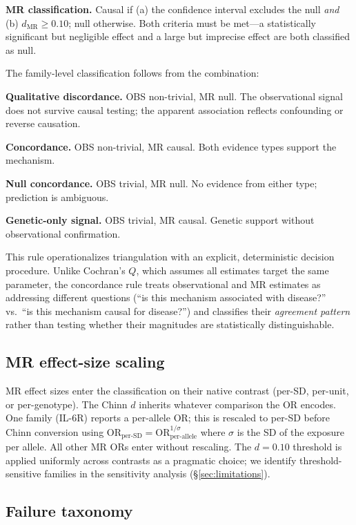 \documentclass[11pt]{article}
\begin{document}
\textbf{MR classification.} Causal if (a) the confidence interval excludes the null \emph{and} (b) $d_{\text{MR}} \geq 0.10$; null otherwise. Both criteria must be met---a statistically significant but negligible effect and a large but imprecise effect are both classified as null.

The family-level classification follows from the combination:

\textbf{Qualitative discordance.} OBS non-trivial, MR null. The observational signal does not survive causal testing; the apparent association reflects confounding or reverse causation.

\textbf{Concordance.} OBS non-trivial, MR causal. Both evidence types support the mechanism.

\textbf{Null concordance.} OBS trivial, MR null. No evidence from either type; prediction is ambiguous.

\textbf{Genetic-only signal.} OBS trivial, MR causal. Genetic support without observational confirmation.

This rule operationalizes triangulation \cite{lawlor2016} with an explicit, deterministic decision procedure. Unlike Cochran's $Q$, which assumes all estimates target the same parameter, the concordance rule treats observational and MR estimates as addressing different questions (``is this mechanism associated with disease?'' vs.\ ``is this mechanism causal for disease?'') and classifies their \emph{agreement pattern} rather than testing whether their magnitudes are statistically distinguishable.

\subsection{MR effect-size scaling}

MR effect sizes enter the classification on their native contrast (per-SD, per-unit, or per-genotype). The Chinn $d$ inherits whatever comparison the OR encodes. One family (IL-6R) reports a per-allele OR; this is rescaled to per-SD before Chinn conversion using $\text{OR}_{\text{per-SD}} = \text{OR}_{\text{per-allele}}^{1/\sigma}$ where $\sigma$ is the SD of the exposure per allele. All other MR ORs enter without rescaling. The $d = 0.10$ threshold is applied uniformly across contrasts as a pragmatic choice; we identify threshold-sensitive families in the sensitivity analysis (\S\ref{sec:limitations}).

\subsection{Failure taxonomy}
\end{document}
